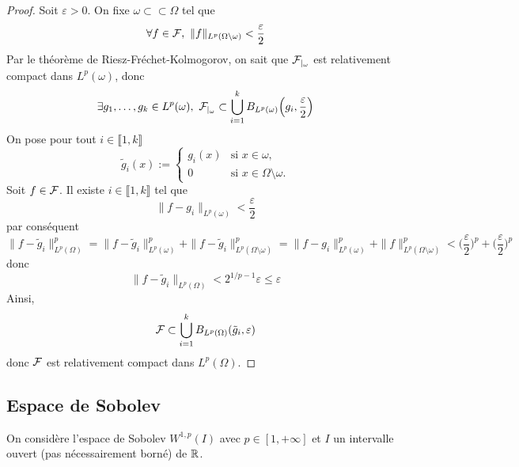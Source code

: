 \begin{proof}
    Soit $\varepsilon >0$. On fixe $\omega \subset \subset \Omega$ tel que 
    \begin{equation*}
        \forall f \in \calF, \ \|f\|_{L^p(\Omega \setminus \omega)} < \frac{\varepsilon}{2}
    \end{equation*}
    Par le théorème de Riesz-Fréchet-Kolmogorov, on sait que $\mathcal{F}_{|_{\omega}}$ est relativement compact dans $L^p(\omega)$, donc 
    \begin{equation*}
        \exists g_1,\dots,g_k \in L^p(\omega), \ \mathcal{F}_{|_{\omega}} \subset \bigcup_{i=1}^k B_{L^p(\omega)}\Big(g_i,\frac{\varepsilon}{2}\Big)
    \end{equation*}
    On pose pour tout $i \in \llbracket 1,k \rrbracket$
    \begin{equation*}
        \tilde{g}_i(x) :=\left\{\begin{array}{cl}
            g_i(x) & \text{si } x \in \omega, \\
            0 & \text{si } x \in \Omega \setminus \omega.
        \end{array}\right.
    \end{equation*}
    Soit $f \in \mathcal{F}$. Il existe $i \in \llbracket 1,k \rrbracket$ tel que 
    \begin{equation*}
        \|f-g_i\|_{L^p(\omega)} < \frac{\varepsilon}{2}
    \end{equation*}
    par conséquent
    \begin{equation*}
        \|f-\tilde{g}_i\|_{L^p(\Omega)}^p = \|f-\tilde{g}_i\|_{L^p(\omega)}^p + \|f-\tilde{g}_i\|_{L^p(\Omega \setminus \omega)}^p = \|f-g_i\|_{L^p(\omega)}^p + \|f\|_{L^p(\Omega \setminus \omega)}^p < \Big(\frac{\varepsilon}{2}\Big)^p+\Big(\frac{\varepsilon}{2}\Big)^p
    \end{equation*}
    donc 
    \begin{equation*}
        \|f-\tilde{g}_i\|_{L^p(\Omega)} < 2^{1/p-1}\varepsilon \leq \varepsilon
    \end{equation*}
    Ainsi,
    \begin{equation*}
        \mathcal{F} \subset \bigcup_{i=1}^k B_{L^p(\Omega)}(\tilde{g}_i, \varepsilon)
    \end{equation*}
    donc $\mathcal{F}$ est relativement compact dans $L^p(\Omega)$.
\end{proof}

\subsection{Espace de Sobolev}
On considère l'espace de Sobolev $W^{1,p}(I)$ avec $p \in [1,+\infty]$ et $I$ un intervalle ouvert (pas nécessairement borné) de $\mathbb{R}$.

